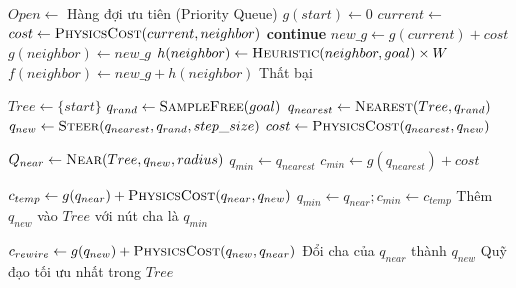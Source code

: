 \documentclass[12pt, a4paper]{article}
\begin{document}
\begin{algorithm}[H]
\caption{Weighted A* với chi phí Vật lý}\label{alg:astar}
\begin{algorithmic}[1]
\State $Open \gets$ Hàng đợi ưu tiên (Priority Queue)
\State {}
\State $g(start) \gets 0$
    \State $current \gets$ 
        \State \Return {}
    \EndIf
        \State $cost \gets \Call{PhysicsCost}{current, neighbor}$
         \textbf{continue} \EndIf
        \State $new\_g \gets g(current) + cost$
            \State $g(neighbor) \gets new\_g$
            \State $h(neighbor) \gets \Call{Heuristic}{neighbor, goal} \times W$
            \State $f(neighbor) \gets new\_g + h(neighbor)$
            \State {}
        \EndIf
    \EndFor
\EndWhile
\State \Return Thất bại
\end{algorithmic}
\end{algorithm}

\begin{algorithm}[H]
\caption{Physics-Aware RRT*}\label{alg:rrtstar}
\begin{algorithmic}[1]
\State $Tree \gets \{start\}$
    \State $q_{rand} \gets \Call{SampleFree}{goal}$
    \State $q_{nearest} \gets \Call{Nearest}{Tree, q_{rand}}$
    \State $q_{new} \gets \Call{Steer}{q_{nearest}, q_{rand}, step\_size}$
    \State $cost \gets \Call{PhysicsCost}{q_{nearest}, q_{new}}$
    
        \State $Q_{near} \gets \Call{Near}{Tree, q_{new}, radius}$
        \State $q_{min} \gets q_{nearest}$
        \State $c_{min} \gets g(q_{nearest}) + cost$
        
            \State $c_{temp} \gets g(q_{near}) + \Call{PhysicsCost}{q_{near}, q_{new}}$
                \State $q_{min} \gets q_{near}; c_{min} \gets c_{temp}$
            \EndIf
        \EndFor
        \State Thêm $q_{new}$ vào $Tree$ với nút cha là $q_{min}$
        
            \State $c_{rewire} \gets g(q_{new}) + \Call{PhysicsCost}{q_{new}, q_{near}}$
                \State Đổi cha của $q_{near}$ thành $q_{new}$
            \EndIf
        \EndFor
    \EndIf
\EndFor
\State \Return Quỹ đạo tối ưu nhất trong $Tree$
\end{algorithmic}
\end{algorithm}
\end{document}
